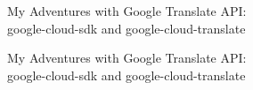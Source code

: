 \documentclass{beamer}
\begin{document}
\begin{frame}{My Adventures with Google Translate API:\\
google-cloud-sdk and google-cloud-translate}


\end{frame}

\begin{frame}{My Adventures with Google Translate API:\\
google-cloud-sdk and google-cloud-translate}


\end{frame}
\end{document}
